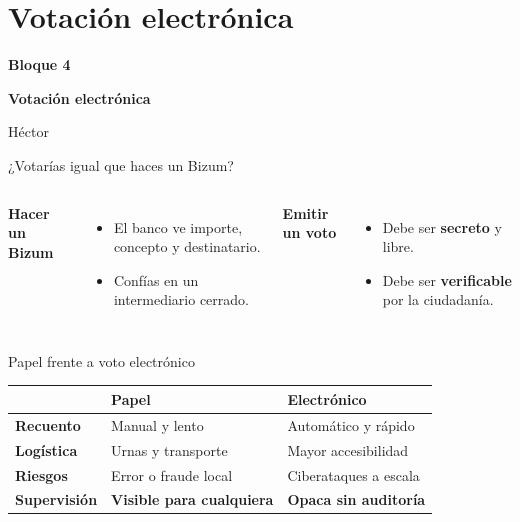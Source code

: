 \documentclass[aspectratio=169,12pt]{beamer}
\def\navprev{}
\def\navnext{}
\newcommand{\nav}[2]{\gdef\navprev{#1}\gdef\navnext{#2}}
\newcommand{\bloque}[3]{%
  \begin{frame}[plain]
    \vfill
    \begin{center}
      {\color{terra}\large\bfseries Bloque #1}\\[0.3cm]
      {\color{azul}\LARGE\bfseries #2\par}\vspace{0.5cm}
      {\large #3}
    \end{center}
    \vfill
  \end{frame}}
\begin{document}
\nav{}{}
\section{Votación electrónica}
\nav{}{}
\bloque{4}{Votación electrónica}{Héctor}

\nav{}{Papel vs. electrónico}
\begin{frame}{¿Votarías igual que haces un Bizum?}
  \vspace{0.4cm}
  \begin{columns}[T]
      {\color{azul}\Large\bfseries Hacer un Bizum}\\[0.3cm]
      \begin{itemize}
        \item El banco ve importe, concepto y destinatario.
        \item Confías en un intermediario cerrado.
      \end{itemize}
      {\color{terra}\Large\bfseries Emitir un voto}\\[0.3cm]
      \begin{itemize}
        \item Debe ser \alert{\textbf{secreto}} y libre.
        \item Debe ser \alert{\textbf{verificable}} por la ciudadanía.
      \end{itemize}
  \end{columns}
\end{frame}

\nav{Bizum vs. voto}{Voto tradicional}
\begin{frame}{Papel frente a voto electrónico}
  \begin{center}
  \renewcommand{\arraystretch}{1.45}
  \begin{tabular}{p{2.9cm} p{4.4cm} p{4.6cm}}
    & {\color{azul}\large\bfseries Papel} & {\color{terra}\large\bfseries Electrónico} \\
    \hline
    \textbf{Recuento} & \raggedright Manual y lento & \raggedright Automático y rápido \tabularnewline
    \hline
    \textbf{Logística} & \raggedright Urnas y transporte & \raggedright Mayor accesibilidad \tabularnewline
    \hline
    \textbf{Riesgos} & \raggedright Error o fraude local & \raggedright Ciberataques a escala \tabularnewline
    \hline
    \textbf{Supervisión} & \raggedright \textbf{Visible para cualquiera} & \raggedright \textcolor{terra}{\textbf{Opaca sin auditoría}} \tabularnewline
  \end{tabular}
  \end{center}
\end{frame}
\end{document}
